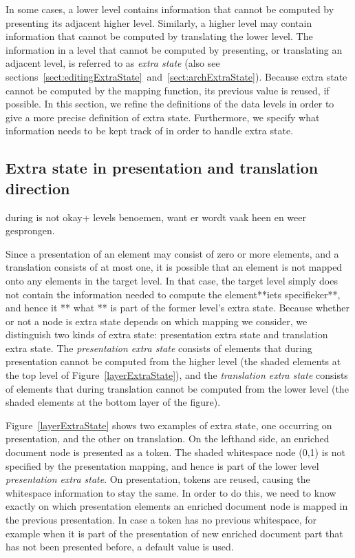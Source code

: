 In some cases, a lower level contains information that cannot be computed by presenting its adjacent higher level. Similarly, a higher level may contain information that cannot be computed by translating the lower level. The information in a level that cannot be computed by presenting, or translating an adjacent level, is referred to as {\em extra state} (also see sections~\ref{sect:editingExtraState}~and~\ref{sect:archExtraState}). Because extra state cannot be computed by the mapping function, its previous value is reused, if possible. In this section, we refine the definitions of the data levels in order to give a more precise definition of extra state. Furthermore, we specify what information needs to be kept track of in order to handle extra state.




%																
\subsection{Extra state in presentation and translation direction}

\bc
during is not okay+ levels benoemen, want er wordt vaak heen en weer gesprongen.

Since a presentation of an element may consist of zero or more elements, and a translation consists of at most one, it is possible that an element is not mapped onto any elements in the target level. In that case, the target level simply does not contain the information needed to compute the element**iets specifieker**, and hence it ** what ** is part of the former level's extra state. Because whether or not a node is extra state depends on which mapping we consider, we distinguish two kinds of extra state: presentation extra state and translation extra state. The {\em presentation extra state} consists of elements that during presentation cannot be computed from the higher level (the shaded elements at the top level of Figure~\ref{layerExtraState}), and the {\em translation extra state} consists of elements that during translation cannot be computed from the lower level (the shaded elements at the bottom layer of the figure).
\ec


Figure~\ref{layerExtraState} shows two examples of extra state, one occurring on presentation, and the other on translation. On the lefthand side, an enriched document node is presented as a token. The shaded whitespace node (0,1) is not specified by the presentation mapping, and hence is part of the lower level {\em presentation extra state}. On presentation, tokens are reused, causing the whitespace information to stay the same. In order to do this, we need to know exactly on which presentation elements an enriched document node is mapped in the previous presentation. In case a token has no previous whitespace, for example when it is part of the presentation of new enriched document part that has not been presented before, a default value is used.


